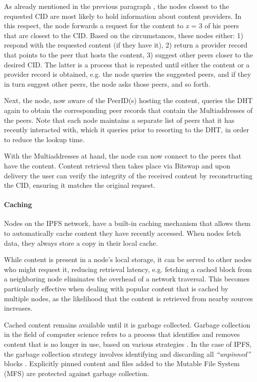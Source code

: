 As already mentioned in the previous paragraph , the nodes closest to the requested CID are most likely to hold information about content providers. In this respect, the node forwards a request for the content to \textit{x} = 3 of his peers that are closest to the CID. Based on the circumstances, these nodes either: 1) respond with the requested content (if they have it), 2) return a provider record that points to the peer that hosts the content, 3) suggest other peers closer to the desired CID. The latter is a process that is repeated until either the content or a provider record is obtained, e.g. the node queries the suggested peers, and if they in turn suggest other peers, the node asks those peers, and so forth.

Next, the node, now aware of the PeerID(s) hosting the content, queries the DHT again to obtain the corresponding peer records that contain the Multiaddresses of the peers. Note that each node maintains a separate list of peers that it has recently interacted with, which it queries prior to resorting to the DHT, in order to reduce the lookup time.

With the Multiaddresses at hand, the node can now connect to the peers that have the content. Content retrieval then takes place via Bitswap and upon delivery the user can verify the integrity of the received content by reconstructing the CID, ensuring it matches the original request.

\paragraph{Caching}\label{par:caching_ipfs}
Nodes on the IPFS network, have a built-in caching mechanism that allows them to automatically cache content they have recently accessed. When nodes fetch data, they always store a copy in their local cache.

While content is present in a node's local storage, it can be served to other nodes who might request it, reducing retrieval latency, e.g. fetching a cached block from a neighboring node eliminates the overhead of a network traversal. This becomes particularly effective when dealing with popular content that is cached by multiple nodes, as the likelihood that the content is retrieved from nearby sources increases.

Cached content remains available until it is garbage collected. Garbage collection in the field of computer science refers to a process that identifies and removes content that is no longer in use, based on various strategies \citep{wilson_1992}. In the case of IPFS, the garbage collection strategy involves identifying and discarding all \emph{``unpinned''} blocks \citep{ipfs_docs_2}. Explicitly pinned content and files added to the Mutable File System (MFS) are protected against garbage collection.

